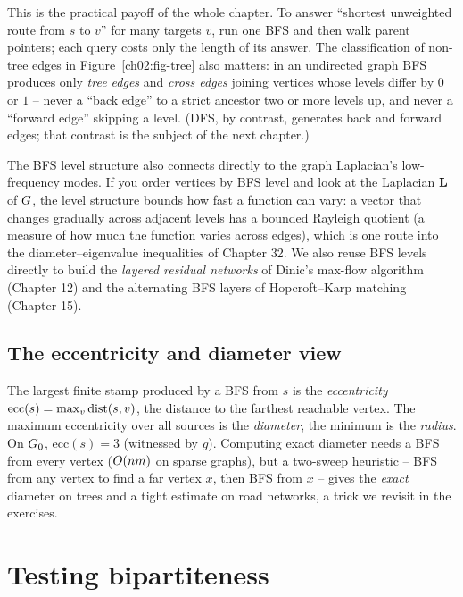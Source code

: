 This is the practical payoff of the whole chapter. To answer ``shortest unweighted
route from $s$ to $v$'' for many targets $v$, run one BFS and then walk parent
pointers; each query costs only the length of its answer. The classification of
non-tree edges in Figure~\ref{ch02:fig-tree} also matters: in an undirected graph
BFS produces only \emph{tree edges} and \emph{cross edges} joining vertices whose
levels differ by $0$ or $1$ -- never a ``back edge'' to a strict ancestor two or
more levels up, and never a ``forward edge'' skipping a level. (DFS, by contrast,
generates back and forward edges; that contrast is the subject of the next
chapter.)

\begin{connectionbox}
The BFS level structure also connects directly to the graph Laplacian's low-frequency
modes. If you order vertices by BFS level and look at the Laplacian $\mathbf{L}$ of
$G$, the level structure bounds how fast a function can vary: a vector that
changes gradually across adjacent levels has a bounded Rayleigh quotient (a measure of how much the function varies across edges), which is one route
into the diameter--eigenvalue inequalities of Chapter 32. We also reuse BFS
levels directly to build the \emph{layered residual networks} of Dinic's max-flow algorithm
(Chapter 12) and the alternating BFS layers of Hopcroft--Karp matching
(Chapter 15).
\end{connectionbox}

\subsection{The eccentricity and diameter view}

The largest finite stamp produced by a BFS from $s$ is the \emph{eccentricity}
$\mathrm{ecc}(s)=\max_v \operatorname{dist}(s,v)$, the distance to the farthest reachable
vertex. The maximum eccentricity over all sources is the \emph{diameter}, the
minimum is the \emph{radius}. On $G_0$, $\mathrm{ecc}(s)=3$ (witnessed by
$g$). Computing exact diameter needs a BFS from every vertex ($O(nm)$ on
sparse graphs), but a two-sweep heuristic -- BFS from any vertex to find a far
vertex $x$, then BFS from $x$ -- gives the \emph{exact} diameter on trees and a
tight estimate on road networks, a trick we revisit in the exercises.

\section{Testing bipartiteness}
\label{ch02:bipartite}


